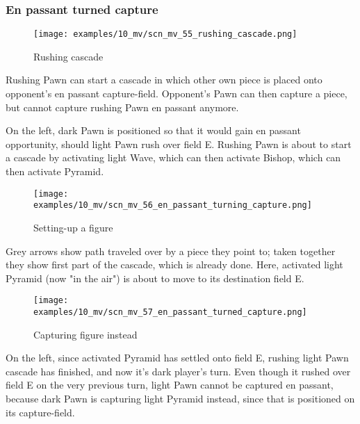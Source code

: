 \subsubsection*{En passant turned capture}
\label{sec:Miranda's veil/Wave/Cascading Waves/En passant turned capture}

\vspace*{-0.7\baselineskip}
\noindent
\begin{wrapfigure}[15]{l}{0.4\textwidth}
\centering
\texttt{[image: examples/10\_mv/scn\_mv\_55\_rushing\_cascade.png]}
\vspace*{-1.4\baselineskip}
\caption{Rushing cascade}
\label{fig:scn_mv_55_rushing_cascade}
\end{wrapfigure}
Rushing Pawn can start a cascade in which other own piece is placed onto opponent's
en passant capture-field.
Opponent's Pawn can then capture a piece, but cannot capture rushing Pawn en passant
anymore.

On the left, dark Pawn is positioned so that it would gain en passant opportunity,
should light Pawn rush over field E. Rushing Pawn is about to start a cascade by
activating light Wave, which can then activate Bishop, which can then activate
Pyramid.


\noindent
\begin{wrapfigure}[7]{l}{0.4\textwidth}
\centering
\texttt{[image: examples/10\_mv/scn\_mv\_56\_en\_passant\_turning\_capture.png]}
\vspace*{-1.4\baselineskip}
\caption{Setting-up a figure}
\label{fig:scn_mv_56_en_passant_turning_capture}
\end{wrapfigure}
Grey arrows show path traveled over by a piece they point to; taken together they
show first part of the cascade, which is already done. \newline
\indent
Here, activated light Pyramid (now "in the air") is about to move to its destination
field E.

\clearpage %

\vspace*{-2.1\baselineskip}
\noindent
\begin{wrapfigure}[11]{l}{0.4\textwidth}
\centering
\texttt{[image: examples/10\_mv/scn\_mv\_57\_en\_passant\_turned\_capture.png]}
\vspace*{-1.4\baselineskip}
\caption{Capturing figure instead}
\label{fig:scn_mv_57_en_passant_turned_capture}
\end{wrapfigure}
On the left, since activated Pyramid has settled onto field E, rushing light Pawn
cascade has finished, and now it's dark player's turn. \newline
\indent
Even though it rushed over field E on the very previous turn, light Pawn cannot
be captured en passant, because dark Pawn is capturing light Pyramid instead,
since that is positioned on its capture-field.


